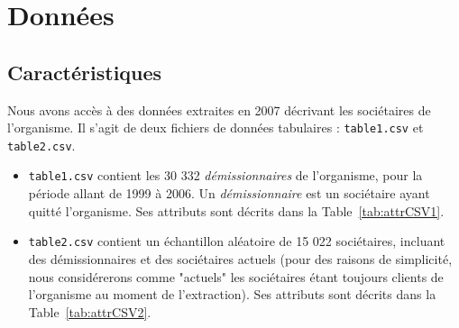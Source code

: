 \documentclass{ceri/sty/rapport}
\begin{document}
\section{Données}

\subsection{Caractéristiques}


Nous avons accès à des données extraites en 2007 décrivant les sociétaires de l'organisme. Il s'agit de deux fichiers de données tabulaires : \texttt{table1.csv} et \texttt{table2.csv}.
\begin{itemize}
    \item \texttt{table1.csv} contient les 30 332 \textit{démissionnaires} de l’organisme, pour la période
allant de 1999 à 2006. Un \textit{démissionnaire} est un sociétaire ayant quitté l'organisme. Ses attributs sont décrits dans la Table~\ref{tab:attrCSV1}.
    \item \texttt{table2.csv} contient un échantillon aléatoire de 15 022 sociétaires, incluant des démissionnaires et des sociétaires actuels (pour des raisons de simplicité, nous considérerons comme "actuels" les sociétaires étant toujours clients de l'organisme au moment de l'extraction). Ses attributs sont décrits dans la Table~\ref{tab:attrCSV2}.
\end{itemize}
\end{document}

